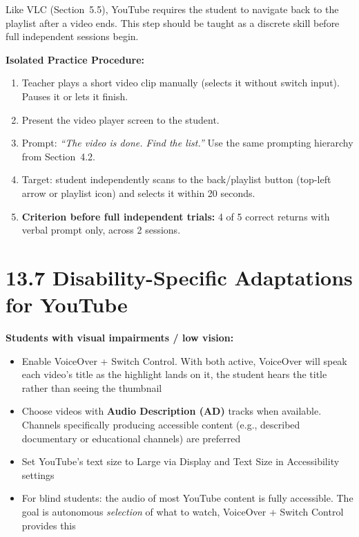 \documentclass[justified,openright]{tufte-book}
\begin{document}
Like VLC (Section~5.5), YouTube requires the student to navigate back
to the playlist after a video ends. This step should be taught as a
discrete skill before full independent sessions begin.


\textbf{Isolated Practice Procedure:}

\begin{enumerate}
\item
  Teacher plays a short video clip manually (selects it without switch
  input). Pauses it or lets it finish.
\item
  Present the video player screen to the student.
\item
  Prompt: \emph{``The video is done. Find the list.''} Use the same
  prompting hierarchy from Section~4.2.
\item
  Target: student independently scans to the back/playlist button
  (top-left arrow or playlist icon) and selects it within 20 seconds.
\item
  \textbf{Criterion before full independent trials:} 4 of 5 correct
  returns with verbal prompt only, across 2 sessions.
\end{enumerate}

\section{13.7 Disability-Specific Adaptations for
YouTube}\label{youtube-disability-adaptations}

\textbf{Students with visual impairments / low vision:}
\begin{itemize}

\item
  Enable VoiceOver + Switch Control. With both active, VoiceOver will
  speak each video's title as the highlight lands on it, the student
  hears the title rather than seeing the thumbnail
\item
  Choose videos with \textbf{Audio Description (AD)} tracks when
  available. Channels specifically producing accessible content (e.g.,
  described documentary or educational channels) are preferred
\item
  Set YouTube's text size to Large via Display and Text Size in
  Accessibility settings
\item
  For blind students: the audio of most YouTube content is fully
  accessible. The goal is autonomous \emph{selection} of what to
  watch, VoiceOver + Switch Control provides this
\end{itemize}
\end{document}
